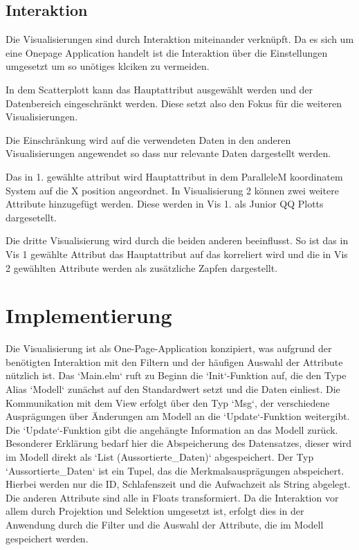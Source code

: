 \documentclass[usegeometry=true]{scrartcl}
\begin{document}
\subsection{Interaktion}
Die Visualisierungen sind durch Interaktion miteinander verknüpft. Da es sich um eine Onepage Application handelt ist die 
Interaktion über die Einstellungen umgesetzt um so unötiges klciken zu vermeiden.

In dem Scatterplott kann das Hauptattribut ausgewählt werden und der Datenbereich eingeschränkt werden. 
Diese setzt also den Fokus für die weiteren Visualisierungen.

Die Einschränkung wird auf die verwendeten Daten in den anderen Visualisierungen angewendet so dass nur relevante Daten dargestellt werden.

Das in 1. gewählte attribut wird  Hauptattribut in dem ParalleleM koordinatem System auf die X position angeordnet.
In Visualisierung 2 können zwei weitere  Attribute hinzugefügt werden. Diese werden in Vis 1. als Junior QQ Plotts dargesetellt.

Die dritte Visualisierung wird durch die beiden anderen beeinflusst. So ist das in Vis 1 gewählte Attribut das Hauptattribut auf das korreliert wird und die in Vis 2 gewählten Attribute werden als zusätzliche Zapfen dargestellt.


\section{Implementierung}

Die Visualisierung ist als One-Page-Application konzipiert, was aufgrund der benötigten Interaktion mit den Filtern und der häufigen Auswahl der Attribute nützlich ist. Das `Main.elm` ruft zu Beginn die `Init`-Funktion auf, die den Type Alias `Modell` zunächst auf den Standardwert setzt und die Daten einliest. Die Kommunikation mit dem View erfolgt über den Typ `Msg`, der verschiedene Ausprägungen über Änderungen am Modell an die `Update`-Funktion weitergibt. Die `Update`-Funktion gibt die angehängte Information an das Modell zurück. Besonderer Erklärung bedarf hier die Abspeicherung des Datensatzes, dieser wird im Modell direkt als `List (Aussortierte\_Daten)` abgespeichert. Der Typ `Aussortierte\_Daten` ist ein Tupel, das die Merkmalsausprägungen abspeichert. Hierbei werden nur die ID, Schlafenszeit und die Aufwachzeit als String abgelegt. Die anderen Attribute sind alle in Floats transformiert. Da die Interaktion vor allem durch Projektion und Selektion umgesetzt ist, erfolgt dies in der Anwendung durch die Filter und die Auswahl der Attribute, die im Modell gespeichert werden.
\end{document}
